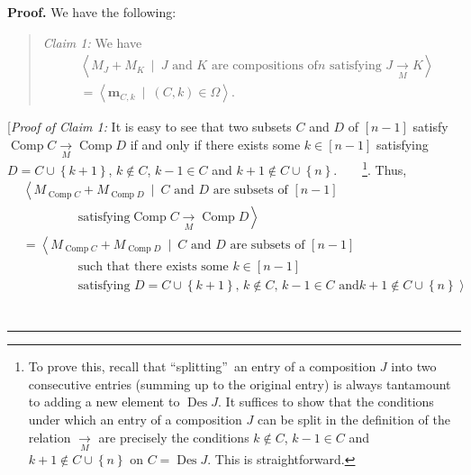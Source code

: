 \documentclass[numbers=enddot,12pt,final,onecolumn,notitlepage]{scrartcl}%
\theoremstyle{definition}
\newenvironment{statement}{\begin{quote}}{\end{quote}}
\newenvironment{proof}[1][Proof]{\noindent\textbf{#1.} }{\ \rule{0.5em}{0.5em}}
\begin{document}
\begin{proof}
We have the following:

\begin{statement}
\textit{Claim 1:} We have%
\begin{align*}
&  \left\langle M_{J}+M_{K}\ \mid\ J\text{ and }K\text{ are compositions of
}n\text{ satisfying }J\underset{M}{\rightarrow}K\right\rangle \\
&  =\left\langle \mathbf{m}_{C,k}\ \mid\ \left(  C,k\right)  \in
\Omega\right\rangle .
\end{align*}

\end{statement}

[\textit{Proof of Claim 1:} It is easy to see that two subsets $C$ and $D$ of
$\left[  n-1\right]  $ satisfy $\operatorname*{Comp}C\underset{M}{\rightarrow
}\operatorname*{Comp}D$ if and only if there exists some $k\in\left[
n-1\right]  $ satisfying $D=C\cup\left\{  k+1\right\}  $, $k\notin C$, $k-1\in
C$ and $k+1\notin C\cup\left\{  n\right\}  $.\ \ \ \ \footnote{To prove this,
recall that \textquotedblleft splitting\textquotedblright\ an entry of a
composition $J$ into two consecutive entries (summing up to the original
entry) is always tantamount to adding a new element to $\operatorname*{Des}J$.
It suffices to show that the conditions under which an entry of a composition
$J$ can be split in the definition of the relation $\underset{M}{\rightarrow}$
are precisely the conditions $k\notin C$, $k-1\in C$ and $k+1\notin
C\cup\left\{  n\right\}  $ on $C=\operatorname*{Des}J$. This is
straightforward.}. Thus,%
\begin{align*}
&  \left\langle M_{\operatorname*{Comp}C}+M_{\operatorname*{Comp}D}%
\ \mid\ C\text{ and }D\text{ are subsets of }\left[  n-1\right]  \right. \\
&  \ \ \ \ \ \ \ \ \ \ \ \ \ \ \ \ \ \ \ \ \left.  \text{satisfying
}\operatorname*{Comp}C\underset{M}{\rightarrow}\operatorname*{Comp}%
D\right\rangle \\
&  =\left\langle M_{\operatorname*{Comp}C}+M_{\operatorname*{Comp}D}%
\ \mid\ C\text{ and }D\text{ are subsets of }\left[  n-1\right]  \right. \\
&  \ \ \ \ \ \ \ \ \ \ \ \ \ \ \ \ \ \ \ \ \left.  \text{such that there
exists some }k\in\left[  n-1\right]  \right. \\
&  \ \ \ \ \ \ \ \ \ \ \ \ \ \ \ \ \ \ \ \ \left.  \text{satisfying }%
D=C\cup\left\{  k+1\right\}  \text{, }k\notin C\text{, }k-1\in C\text{ and
}k+1\notin C\cup\left\{  n\right\}  \right\rangle \\

\end{align*}
\end{proof}
\end{document}

